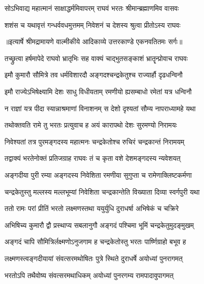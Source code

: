 \twolineshloka
{सोऽभिवाद्य महात्मानं साक्षाद्धर्ममिवापरम्}
{राघवं भरतः श्रीमान्ब्रह्माणमिव वासवः} %

\twolineshloka
{शशंस च यथावृत्तं गन्धर्ववधमुत्तमम्}
{निवेशनं च देशस्य श्रुत्वा प्रीतोऽस्य राघवः} %


{॥इत्यार्षे श्रीमद्रामायणे वाल्मीकीये आदिकाव्ये उत्तरकाण्डे एकनवतितमः सर्गः॥}


\twolineshloka
{तच्छ्रुत्वा हर्षमापेदे राघवो भ्रातृभिः सह}
{वाक्यं चाद्भुतसङ्काशं भ्रातॄन्प्रोवाच राघवः} %

\twolineshloka
{इमौ कुमारौ सौमित्रे तव धर्मविशारदौ}
{अङ्गदश्चन्द्रकेतुश्च राज्यार्हौ दृढधन्विनौ} %

\twolineshloka
{इमौ राज्येऽभिषेक्ष्यामि देशः साधु विधीयताम्}
{रमणीयो ह्यसम्बाधो रमेतां यत्र धन्विनौ} %

\twolineshloka
{न राज्ञां यत्र पीदा स्यान्नाश्रमाणां विनाशनम्}
{स देशो दृश्यतां सौम्य नापराध्यामहे यथा} %

\twolineshloka
{तथोक्तवति रामे तु भरतः प्रत्युवाच ह}
{अयं कारापथो देशः सुरमण्यो निरामयः} %

\twolineshloka
{निवेश्यतां तत्र पुरमङ्गदस्य महात्मनः}
{चन्द्रकेतोश्च रुचिरं चन्द्रकान्तं निरामयम्} %

\twolineshloka
{तद्वाक्यं भरतेनोक्तं प्रतिजग्राह राघवः}
{तं च कृता वशे देशमङ्गदस्य न्यवेशयत्} %

\twolineshloka
{अङ्गदीया पुरी रम्या अङ्गदस्य निवेशिता}
{रमणीया सुगुप्ता च रामेणाक्लिष्टकर्मणा} %

\twolineshloka
{चन्द्रकेतुस्तु मल्लस्य मल्लभूम्यां निवेशिता}
{चन्द्रकान्तेति विख्याता दिव्या स्वर्गपुरी यथा} %

\twolineshloka
{ततो रामः परां प्रीतिं भरतो लक्ष्मणस्तथा}
{ययुर्युधि दुराधर्षा अभिषेकं च चक्रिरे} %

\twolineshloka
{अभिषिच्य कुमारौ द्वौ प्रस्थाप्य सबलानुगौ}
{अङ्गदं पश्चिमा भूमिं चन्द्रकेतुमुदङ्मुखम्} %

\twolineshloka
{अङ्गदं चापि सौमित्रिर्लक्ष्मणोऽनुजगाम ह}
{चन्द्रकेतोस्तु भरतः पार्ष्णिग्राहो बभूव ह} %

\twolineshloka
{लक्ष्मणस्त्वङ्गदीयायां संवत्सरमथोषितः}
{पुत्रे स्थिते दुराधर्षे अयोध्यां पुनरागमत्} %

\twolineshloka
{भरतोऽपि तथैवोष्य संवत्सरमथाधिकम्}
{अयोध्यां पुनरगम्य रामपादावुपागमत्} %

